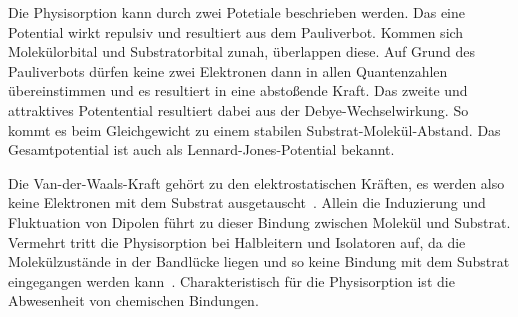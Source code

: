 
            Die Physisorption kann durch zwei Potetiale beschrieben werden.
            Das eine Potential wirkt repulsiv und resultiert aus dem Pauliverbot.
            Kommen sich Molekülorbital und Substratorbital zunah, überlappen diese.
            Auf Grund des Pauliverbots dürfen keine zwei Elektronen dann in allen Quantenzahlen übereinstimmen und es resultiert in eine abstoßende Kraft.
            Das zweite und attraktives Potentential resultiert dabei aus der Debye-Wechselwirkung.
            So kommt es beim Gleichgewicht zu einem stabilen Substrat-Molekül-Abstand.
            Das Gesamtpotential ist auch als Lennard-Jones-Potential bekannt.
            
            Die Van-der-Waals-Kraft gehört zu den elektrostatischen Kräften, es werden also keine Elektronen mit dem Substrat ausgetauscht~\cite{bergenti_spinterface_2019}.
            Allein die Induzierung und Fluktuation von Dipolen führt zu dieser Bindung zwischen Molekül und Substrat.
            Vermehrt tritt die Physisorption bei Halbleitern und Isolatoren auf, da die Molekülzustände in der Bandlücke liegen und so keine Bindung mit dem Substrat eingegangen werden kann~\cite{IF_1}.
            Charakteristisch für die Physisorption ist die Abwesenheit von chemischen Bindungen.
        
